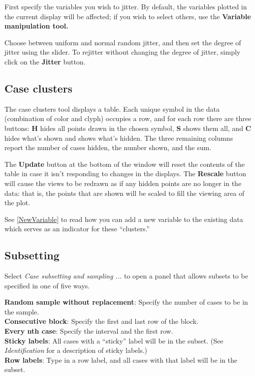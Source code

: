 \documentclass[11pt]{article}
\begin{document}
First specify the variables you wish to jitter.  By default, the
variables plotted in the current display will be affected; if you
wish to select others, use the {\bf Variable manipulation tool.}

Choose between uniform and normal random jitter, and then set the degree of
jitter using the slider.  To rejitter without changing the degree of
jitter, simply click on the {\bf Jitter} button.

\subsection{Case clusters}

The case clusters tool displays a table.  Each unique
symbol in the data (combination of color and clyph) occupies
a row, and for each row there are three buttons:  {\bf H}
hides all points drawn in the chosen symbol, {\bf S} shows
them all, and {\bf C} hides what's shown and shows what's
hidden.  The three remaining columns report the number of
cases hidden, the number shown, and the sum.

The {\bf Update} button at the bottom of the window will reset
the contents of the table in case it isn't responding to changes
in the displays.  The {\bf Rescale} button will cause the views
to be redrawn as if any hidden points are no longer in the data:
that is, the points that are shown will be scaled to fill the
viewing area of the plot.

See \ref{NewVariable} to read how you can add a new variable to the
existing data which serves as an indicator for these ``clusters.''

\subsection{Subsetting}

Select {\em Case subsetting and sampling ...} to open a panel
that allows subsets to be specified in one of five ways.

{\bf Random sample without replacement}:  Specify the number of
cases to be in the sample.
\\{\bf Consecutive block}:  Specify the first and last row of the block.
\\{\bf Every nth case}:  Specify the interval and the first row.
\\{\bf Sticky labels}:  All cases with a ``sticky'' label will
  be in the subset.  (See {\em Identification} for a description
  of sticky labels.)
\\{\bf Row labels}: Type in a row label, and all cases with that
  label will be in the subset.
\end{document}
